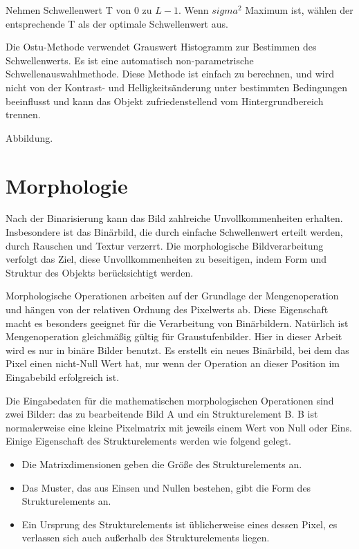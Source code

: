 Nehmen Schwellenwert T von 0 zu $ L-1 $. Wenn $ sigma^2 $ Maximum ist, wählen der entsprechende T als der optimale Schwellenwert aus.

Die Ostu-Methode verwendet Grauswert Histogramm zur Bestimmen des Schwellenwerts. Es ist eine automatisch non-parametrische Schwellenauswahlmethode. Diese Methode ist einfach zu berechnen, und wird nicht von der Kontrast- und Helligkeitsänderung unter bestimmten Bedingungen beeinflusst und kann das Objekt zufriedenstellend vom Hintergrundbereich trennen.

Abbildung. 















\section{Morphologie}

Nach der Binarisierung kann das Bild zahlreiche Unvollkommenheiten erhalten. Insbesondere ist das Binärbild, die durch einfache Schwellenwert erteilt werden, durch Rauschen und Textur verzerrt. Die morphologische Bildverarbeitung verfolgt das Ziel, diese Unvollkommenheiten zu beseitigen, indem Form und Struktur des Objekts berücksichtigt werden.

Morphologische Operationen arbeiten auf der Grundlage der Mengenoperation und hängen von der relativen Ordnung des Pixelwerts ab. Diese Eigenschaft macht es besonders geeignet für die Verarbeitung von Binärbildern. Natürlich ist Mengenoperation gleichmäßig gültig für Graustufenbilder. Hier in dieser Arbeit wird es nur in binäre Bilder benutzt. Es erstellt ein neues Binärbild, bei dem das Pixel einen nicht-Null Wert hat, nur wenn der Operation an dieser Position im Eingabebild erfolgreich ist.

Die Eingabedaten für die mathematischen morphologischen Operationen sind zwei Bilder: das zu bearbeitende Bild A und ein Strukturelement B. B ist normalerweise eine kleine Pixelmatrix mit jeweils einem Wert von Null oder Eins. Einige Eigenschaft des Strukturelements werden wie folgend gelegt.

\begin{itemize}

\item Die Matrixdimensionen geben die Größe des Strukturelements an.
\item Das Muster, das aus Einsen und Nullen bestehen, gibt die Form des Strukturelements an.
\item Ein Ursprung des Strukturelements ist üblicherweise eines dessen Pixel, es verlassen sich auch außerhalb des Strukturelements liegen. 

\end{itemize}


